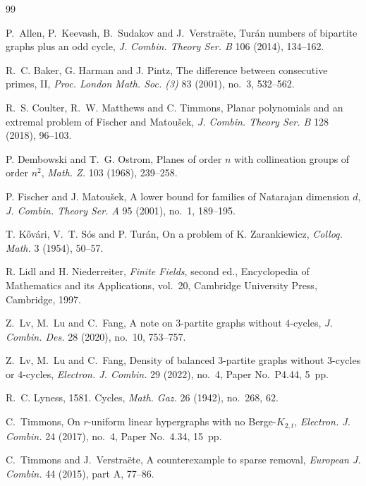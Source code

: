 \documentclass[12pt]{article}
\numberwithin{equation}{section}
\theoremstyle{definition}
\begin{document}
\begingroup
\small
\begin{thebibliography}{99}
\setlength{\itemsep}{0.15em}

 P.~Allen, P.~Keevash, B.~Sudakov and J.~Verstra\"ete, Tur\'an numbers of bipartite graphs plus an odd cycle, \emph{J. Combin. Theory Ser. B} 106 (2014), 134--162.

 R.~C. Baker, G. Harman and J. Pintz, The difference between consecutive primes, II, \emph{Proc. London Math. Soc. (3)} 83 (2001), no.~3, 532--562.

 R.~S. Coulter, R.~W. Matthews and C. Timmons, Planar polynomials and an extremal problem of Fischer and Matou\v{s}ek, \emph{J. Combin. Theory Ser. B} 128 (2018), 96--103.

 P. Dembowski and T.~G. Ostrom, Planes of order $n$ with collineation groups of order $n^2$, \emph{Math. Z.} 103 (1968), 239--258.

 P. Fischer and J. Matou\v{s}ek, A lower bound for families of Natarajan dimension $d$, \emph{J. Combin. Theory Ser. A} 95 (2001), no.~1, 189--195.

 T. K\H{o}v\'ari, V.~T. S\'os and P. Tur\'an, On a problem of K. Zarankiewicz, \emph{Colloq. Math.} 3 (1954), 50--57.

 R. Lidl and H. Niederreiter, \emph{Finite Fields}, second ed., Encyclopedia of Mathematics and its Applications, vol.~20, Cambridge University Press, Cambridge, 1997.\par

 Z.~Lv, M.~Lu and C.~Fang, A note on $3$-partite graphs without $4$-cycles, \emph{J. Combin. Des.} 28 (2020), no.~10, 753--757.

 Z.~Lv, M.~Lu and C.~Fang, Density of balanced $3$-partite graphs without $3$-cycles or $4$-cycles, \emph{Electron. J. Combin.} 29 (2022), no.~4, Paper No.~P4.44, 5~pp.

 R.~C. Lyness, 1581. Cycles, \emph{Math. Gaz.} 26 (1942), no.~268, 62.

 C.~Timmons, On $r$-uniform linear hypergraphs with no Berge-$K_{2,t}$, \emph{Electron. J. Combin.} 24 (2017), no.~4, Paper No.~4.34, 15~pp.

 C.~Timmons and J.~Verstra\"ete, A counterexample to sparse removal, \emph{European J. Combin.} 44 (2015), part A, 77--86.

\end{thebibliography}
\endgroup
\end{document}
